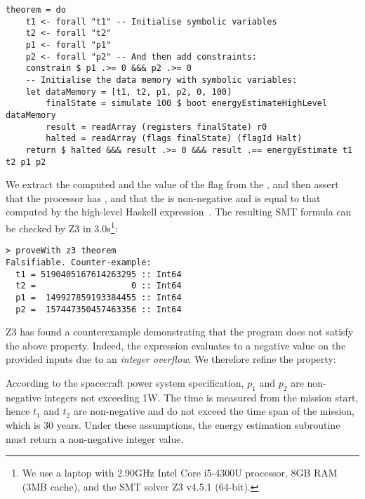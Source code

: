 \vspace{1mm}
\begin{verbatim}
theorem = do
    t1 <- forall "t1" -- Initialise symbolic variables
    t2 <- forall "t2"
    p1 <- forall "p1"
    p2 <- forall "p2" -- And then add constraints:
    constrain $ p1 .>= 0 &&& p2 .>= 0
    -- Initialise the data memory with symbolic variables:
    let dataMemory = [t1, t2, p1, p2, 0, 100]
        finalState = simulate 100 $ boot energyEstimateHighLevel dataMemory
        result = readArray (registers finalState) r0
        halted = readArray (flags finalState) (flagId Halt)
    return $ halted &&& result .>= 0 &&& result .== energyEstimate t1 t2 p1 p2
\end{verbatim}
\vspace{1mm}

\noindent
We extract the computed  and the value of the flag  from the
, and then assert that the processor has , and that
the  is non-negative and is equal to that computed by the high-level
Haskell expression~.
The resulting SMT formula can be checked by Z3 in
3.0s\footnote{We use a laptop with 2.90GHz Intel Core i5-4300U processor, 8GB
RAM (3MB cache), and the SMT solver Z3 v4.5.1 (64-bit).}:

\vspace{1mm}
\begin{verbatim}
> proveWith z3 theorem
Falsifiable. Counter-example:
  t1 = 5190405167614263295 :: Int64
  t2 =                   0 :: Int64
  p1 =  149927859193384455 :: Int64
  p2 =  157447350457463356 :: Int64
\end{verbatim}
\vspace{1mm}

\noindent
Z3 has found a counterexample demonstrating that the program does not
satisfy the above property. Indeed, the expression evaluates to a negative
value on the provided inputs due to an \emph{integer overflow}. We therefore
refine the property:

\vspace{1mm}
\begin{tcolorbox}
According to the spacecraft power system specification, $p_1$ and $p_2$ are
non-negative integers not exceeding 1W. The time is measured
from the mission start, hence $t_1$ and $t_2$ are non-negative and do not exceed
the time span of the mission, which is 30 years. Under these assumptions,
the energy estimation subroutine must return a non-negative integer value.
\end{tcolorbox}
\vspace{1mm}

